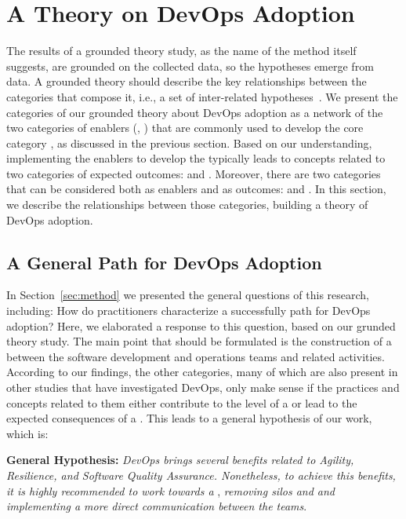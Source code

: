 \section{A Theory on DevOps Adoption} \label{sec:results}

The results of a grounded theory study, as the name of the method itself
suggests, are grounded on the collected data, so the hypotheses emerge from
data. A grounded theory should describe the key relationships between the
categories that compose it, i.e., a set of inter-related hypotheses~\cite{hoda2017becoming}.
We present the categories of our grounded theory
about DevOps adoption as a network of the two categories of enablers (,
) that are commonly used to develop the core category
\cc, as discussed in the previous section. Based on our understanding,
implementing the enablers to develop the \cc typically leads
to concepts related to two categories of expected outcomes:
 and . Moreover, there are two categories that can be considered
both as enablers and as outcomes:  and .
In this section, we describe the relationships between those categories, building a theory
of DevOps adoption.

\subsection{A General Path for DevOps Adoption}

In Section~\ref{sec:method} we presented the general questions of this
research, including: How do practitioners characterize a successfully path
   for DevOps adoption? Here, we elaborated a response to this question,
based on our grunded theory study. The main
point that should be formulated is the construction of a  between the software development and operations teams and
related activities. According to our findings, the other categories,
many of which are also present in other studies that have investigated DevOps,
only make sense if the practices and concepts related to them either contribute
to the level of a \cc or lead to the expected consequences
of a \cc. This leads to a general hypothesis of our work, which is:

\begin{mh}
  {\bf General Hypothesis:} \textit{DevOps brings several benefits
  related to Agility, Resilience, and Software Quality
  Assurance. Nonetheless, to achieve this benefits,
  it is highly recommended to work towards a} \cc,
  \textit{removing silos and and implementing a more direct
  communication between the teams}. 
\end{mh}

